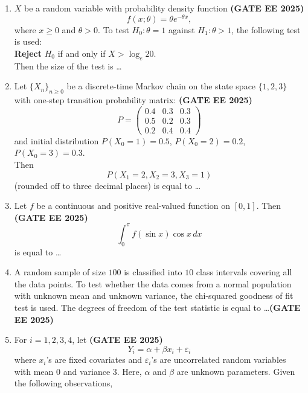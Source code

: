 \documentclass[journal,12pt,onecolumn]{IEEEtran}
\theoremstyle{remark}
\begin{document}
\begin{enumerate}
\item  $X$ be a random variable with probability density function \hfill \textbf{(GATE EE 2025)}\\
\[
f(x;\theta) = \theta e^{-\theta x},
\]
where $x \ge 0$ and $\theta > 0$. To test $H_0: \theta=1$ against $H_1: \theta>1$, the following test is used: \\

\textbf{Reject} $H_0$ if and only if $X > \log_e 20$. \\

Then the size of the test is \dots

\item Let $\{X_n\}_{n \geq 0}$ be a discrete-time Markov chain on the state space $\{1,2,3\}$ with one-step transition probability matrix: \hfill \textbf{(GATE EE 2025)}\\
\[
P = 
\begin{pmatrix}
0.4 & 0.3 & 0.3 \\
0.5 & 0.2 & 0.3 \\
0.2 & 0.4 & 0.4
\end{pmatrix}
\]
and initial distribution $P(X_0=1)=0.5$, $P(X_0=2)=0.2$, $P(X_0=3)=0.3$. \\

Then 
\[
P(X_1=2, X_2=3, X_3=1)
\]
(rounded off to three decimal places) is equal to \dots

\item Let $f$ be a continuous and positive real-valued function on $[0,1]$. Then  \hfill \textbf{(GATE EE 2025)}\\
\[
\int_0^{\pi} f(\sin x)\cos x \, dx 
\]
is equal to \dots

\item A random sample of size $100$ is classified into $10$ class intervals covering all the data points. To test whether the data comes from a normal population with unknown mean and unknown variance, the chi-squared goodness of fit test is used. The degrees of freedom of the test statistic is equal to \dots  \hfill \textbf{(GATE EE 2025)}\\

\item For $i = 1,2,3,4$, let  \hfill \textbf{(GATE EE 2025)}\\
\[
Y_i = \alpha + \beta x_i + \varepsilon_i
\] 
where $x_i$'s are fixed covariates and $\varepsilon_i$'s are uncorrelated random variables with mean $0$ and variance $3$. Here, $\alpha$ and $\beta$ are unknown parameters. Given the following observations,


\end{enumerate}
\end{document}
